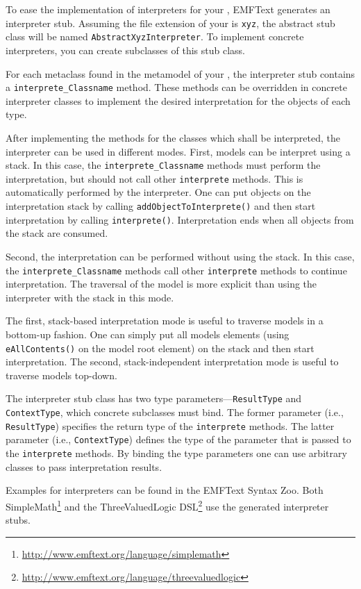 To ease the implementation of interpreters for your \DSL, EMFText generates an
interpreter stub. Assuming the file extension of your \DSL is \texttt{xyz}, the
abstract stub class will be named \texttt{AbstractXyzInterpreter}. To implement
concrete interpreters, you can create subclasses of this stub class.

For each metaclass found in the metamodel of your \DSL, the interpreter
stub contains a \texttt{interprete\_Classname} method. These methods can be
overridden in concrete interpreter classes to implement the desired interpretation for the
objects of each type.

After implementing the methods for the classes which shall be interpreted, the
interpreter can be used in different modes. First, models can be interpret using
a stack. In this case, the \texttt{interprete\_Classname} methods must
perform the interpretation, but should not call other
\texttt{interprete} methods. This is automatically performed by the
interpreter. One can put objects on the interpretation stack by calling
\texttt{addObjectToInterprete()} and then start
interpretation by calling \texttt{interprete()}. Interpretation ends
when all objects from the stack are consumed.

Second, the interpretation can be performed without using the stack. In this
case, the \texttt{interprete\_Classname} methods call other
\texttt{interprete} methods to continue interpretation. The traversal of the
model is more explicit than using the interpreter with the stack in this mode.

The first, stack-based interpretation mode is useful to traverse models in a
bottom-up fashion. One can simply put all models elements (using
\texttt{eAllContents()} on the model root element) on the stack and then start
interpretation. The second, stack-independent interpretation mode is useful to
traverse models top-down.

The interpreter stub class has two type parameters---\texttt{ResultType} and
\texttt{ContextType}, which concrete subclasses must bind. The former
parameter (i.e., \texttt{ResultType}) specifies the return type of the
\texttt{interprete} methods. The latter parameter (i.e., \texttt{ContextType})
defines the type of the parameter that is passed to the \texttt{interprete}
methods. By binding the type parameters one can use arbitrary classes to pass
interpretation results.

Examples for interpreters can be found in the EMFText Syntax
Zoo. Both SimpleMath\footnote{\url{http://www.emftext.org/language/simplemath}}
and the ThreeValuedLogic
DSL\footnote{\url{http://www.emftext.org/language/threevaluedlogic}} use the
generated interpreter stubs.

